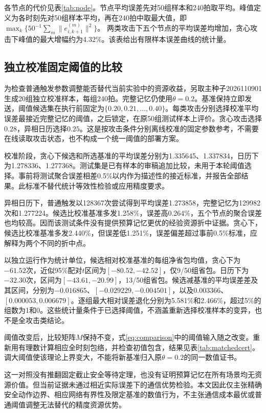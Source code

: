 \documentclass[UTF8,a4paper,zihao=5,fontset=windows]{ctexart}
\begin{document}
各节点的代价见表\ref{tab:node}。节点平均误差先对50组样本和240拍取平均。峰值定义为各时刻先对50组样本平均，再在240拍中取最大值，即
$\max_k\{50^{-1}\sum_m\|e_{i,k+1}^{(m)}\|^2\}$。
两类攻击下五个节点的平均误差均增加，贪心攻击下峰值的最大增幅约为4.32\%。该表给出有限样本误差曲线的统计量。


\subsection{独立校准固定阈值的比较}
为检查普通触发参数调整能否替代当前实验中的资源收益，另取主种子2026110901生成20组独立校准样本，每组240拍。完整记忆仍使用$\theta=0.2$。基准保持立即发送，阈值候选集在执行前固定为$\{0.20,0.21,\ldots,0.40\}$。每类攻击分别选择校准平均误差最接近完整记忆的阈值，之后锁定，在原50组测试样本上评价。贪心攻击选择$0.28$，异相日历选择$0.25$。这是按攻击条件分别离线校准的固定参数参考，不需要在线读取攻击状态，也不构成一个统一阈值的部署方案。

校准阶段，贪心下候选和所选基准的平均误差分别为1.335645、1.337834，日历下为1.278336、1.277368。测试集是已有样本的审稿追加比较，未用于本轮阈值选择。事前将测试聚合误差相差0.5\%以内作为描述性的接近标准，并报告全部结果。此标准不替代统计等效性检验或应用精度要求。



异相日历下，普通触发以128367次尝试得到平均误差1.273858，完整记忆为129982次和1.277224。候选比校准基准多发1.258\%，误差高0.264\%，五个节点的聚合误差也均较高。因而该测试条件没有提供预算记忆更优的经验资源折中证据。贪心下，候选比校准基准多发2.440\%，但误差低1.251\%，误差偏差超过事前0.5\%标准，应解释为两个不同的折中点。



以独立运行作为统计单位，候选相对校准基准的每组净省包均值，贪心下为$-61.52$次，近似95\%配对$t$区间为$[-80.52,-42.52]$，仅9/50组省包。日历下为$-32.30$次，区间为$[-43.61,-20.99]$，13/50组省包。候选减基准的平均误差差及其区间，分别为$-0.016865$、$[-0.029229,-0.004501]$，以及$0.003366$、$[0.000053,0.006679]$。逐组最大相对误差退化分别为5.581\%和2.466\%，超过5\%的组数为1和0。这些统计量条件于已选择阈值，不涵盖重新选择校准样本的变异，也不是全攻击类结论。

阈值改变后，比较矩阵$M$保持不变，式\eqref{eq:comparison}中的阈值输入随之改变。重新用有理数计算相应全时刻包络，并检查初值包含，结果见表\ref{tab:matchedcert}。调大阈值使该理论上界变大，不能将新基准归入原$\theta=0.2$的同一数值证书。


这一对照没有推翻固定截止安全等待定理，也没有证明预算记忆在所有场景均无资源价值。但当前证据未通过相近实际误差下的通信优势检验。本文因此仅主张精确安全动作边界、相应网络有界性及限定基准的数值行为，不主张通信成本最优或普通阈值调整无法替代的精度资源优势。
\end{document}
